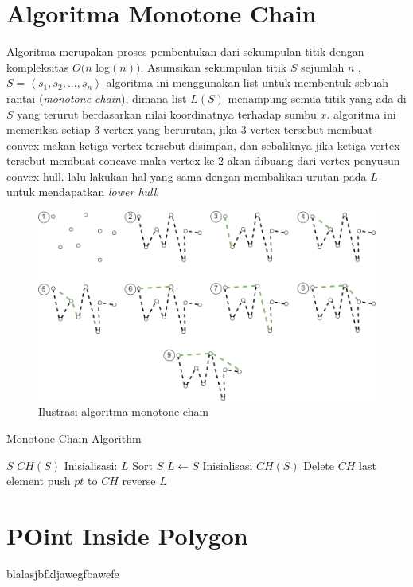 \section{Algoritma Monotone Chain}
Algoritma \MC merupakan proses pembentukan \CH dari sekumpulan titik dengan kompleksitas $O(n$ log$(n))$\cite{monotone_chain_algorithm}. Asumsikan sekumpulan titik $S$ sejumlah $n$ ,$S = \left \langle s_1, s_2, ..., s_n\right \rangle$ algoritma ini menggunakan list untuk membentuk sebuah rantai (\textit{monotone chain}), dimana list $L(S)$ menampung semua titik yang ada di $S$ yang terurut berdasarkan nilai koordinatnya terhadap sumbu $x$. algoritma ini memeriksa setiap 3 vertex yang berurutan, jika 3 vertex tersebut membuat convex makan ketiga vertex tersebut disimpan, dan sebaliknya jika ketiga vertex tersebut membuat concave maka vertex ke 2 akan dibuang dari vertex penyusun convex hull. lalu lakukan hal yang sama dengan membalikan urutan pada $L$ untuk mendapatkan \textit{lower hull}.

\begin{figure}
	\Centering
	\includegraphics [width=\columnwidth]{bab2/img/ilustrasi-algoritma-monotone-chain}
	\caption {Ilustrasi algoritma monotone chain}
	\label {fig:ilustrasi-algoritma-monotone-chain}
\end{figure}

\begin{algorithm}
	\caption{Monotone Chain Algorithm}
	\label{psdo:Monotone Chain Algorithm}
	\begin{algorithmic}[1]
		\Require $S$
		\Ensure $CH(S)$
        \State Inisialisasi: $L$
        \State Sort $S$
        \State $L \leftarrow S$
        \State Inisialisasi $CH(S)$
                    \State Delete $CH$ last element
                \EndWhile
                \State push $pt$ to $CH$
            \EndFor
            \State reverse $L$
        \EndFor
	\end{algorithmic}
\end{algorithm}
\section{POint Inside Polygon}
blalasjbfkljawegfbawefe \cite{point_inside_polygon}